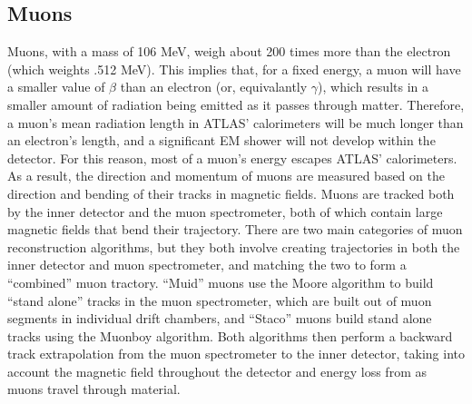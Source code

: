 \subsection{Muons}
Muons, with a mass of 106 MeV, weigh about 200 times more than the electron (which weights .512 MeV).
This implies that, for a fixed energy, a muon will have a smaller value of $\beta$ than an electron (or, equivalantly $\gamma$), which results in a smaller amount of radiation being emitted as it passes through matter.
Therefore, a muon's mean radiation length in ATLAS' calorimeters will be much longer than an electron's length, and a significant EM shower will not develop within the detector.
For this reason, most of a muon's energy escapes ATLAS' calorimeters.
As a result, the direction and momentum of muons are measured based on the direction and bending of their tracks in magnetic fields.
Muons are tracked both by the inner detector and the muon spectrometer, both of which contain large magnetic fields that bend their trajectory.
There are two main categories of muon reconstruction algorithms, but they both involve creating trajectories in both the inner detector and muon spectrometer, and matching the two to form a ``combined'' muon tractory.
``Muid'' muons use the Moore algorithm to build ``stand alone'' tracks in the muon spectrometer, which are built out of muon segments in individual drift chambers, and ``Staco'' muons build stand alone tracks using the Muonboy algorithm.
Both algorithms then perform a backward track extrapolation from the muon spectrometer to the inner detector, taking into account the magnetic field throughout the detector and energy loss from as muons travel through material.





